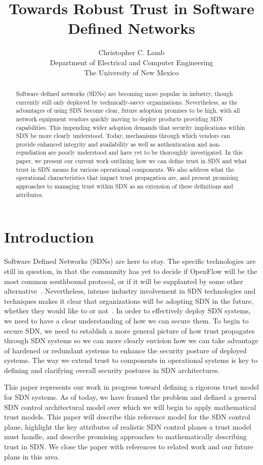 \documentclass[10pt,conference]{IEEEtran}
\author{Christopher C. Lamb \\ Department of Electrical and Computer Engineering \\ The University of New Mexico}
\author{
\IEEEauthorblockN{Christopher C. Lamb}
\IEEEauthorblockA{Dept. of Electrical and Computer Engineering\\
The University of New Mexico\\
Albuquerque, New Mexico 87131\\
Email: cclamb@ece.unm.edu}
\and
\IEEEauthorblockN{Gregory L. Heileman}
\IEEEauthorblockA{Dept. of Electrical and Computer Engineering\\
The University of New Mexico\\
Albuquerque, New Mexico 87131\\
Email: heileman@ece.unm.edu}
}
\title{Towards Robust Trust in Software Defined Networks}
\begin{document}
\maketitle

\begin{abstract}
Software defined networks (SDNs) are becoming more popular in industry, though currently still only deployed by technically-savvy organizations.  Nevertheless, as the advantages of using SDN become clear, future adoption promises to be high, with all network equipment vendors quickly moving to deploy products providing SDN capabilities.  This impending wider adoption demands that security implications within SDN be more clearly understood.  Today, mechanisms through which vendors can provide enhanced integrity and availability as well as authentication and non-repudiation are poorly understood and have yet to be thoroughly investigated.  In this paper, we present our current work outlining how we can define trust in SDN and what trust in SDN means for various operational components.  We also address what the operational characteristics that impact trust propagation are, and present promising approaches to managing trust within SDN as an extension of these definitions and attributes.
\end{abstract}

\section{Introduction}
Software Defined Networks (SDNs) are here to stay. The specific technologies are still in question, in that the community has yet to decide if OpenFlow will be the most common southbound protocol, or if it will be supplanted by some other alternative~\cite{rfc6241}.  Nevertheless, intense industry involvement in SDN technologies and techniques makes it clear that organizations will be adopting SDN in the future, whether they would like to or not~\cite{opendaylight}.  In order to effectively deploy SDN systems, we need to have a clear understanding of how we can secure them.  To begin to secure SDN, we need to establish a more general picture of how trust propagates through SDN systems so we can more clearly envision how we can take advantage of hardened or redundant systems to enhance the security posture of deployed systems.  The way we extend trust to components in operational systems is key to defining and clarifying overall security postures in SDN architectures.

This paper represents our work in progress toward defining a rigorous trust model for SDN systems.  As of today, we have framed the problem and defined a general SDN control architectural model over which we will begin to apply mathematical trust models.  This paper will describe this reference model for the SDN control plane, highlight the key attributes of realistic SDN control planes a trust model must handle, and describe promising approaches to mathematically describing trust in SDN.  We close the paper with references to related work and our future plans in this area.
\end{document}
